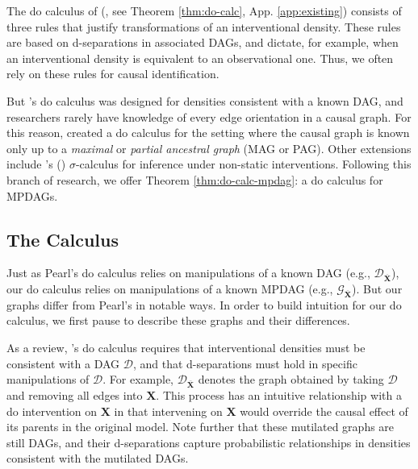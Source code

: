 \documentclass[11pt]{article}
\newcommand{\mb}[1]{\mathbf{#1}}
\newcommand{\g}[1][G]{\mathcal{#1}}
\begin{document}
The do calculus of \citeauthor{pearl2009causality} (\citeyear{pearl2009causality}, see Theorem \ref{thm:do-calc}, App. \ref{app:existing}) consists of three rules that justify transformations of an interventional density. These rules are based on d-separations in associated DAGs, and dictate, for example, when an interventional density is equivalent to an observational one. Thus, we often rely on these rules for causal identification.

But \citeauthor{pearl2009causality}'s do calculus was designed for densities consistent with a known DAG, and researchers rarely have knowledge of every edge orientation in a causal graph. For this reason, \cite{zhang2008causal} created a do calculus for the setting where the causal graph is known only up to a \textit{maximal} or \textit{partial ancestral graph} (MAG or PAG). Other extensions include \citeauthor{correa2020calculus}'s (\citeyear{correa2020calculus}) $\sigma$-calculus for inference under non-static interventions. Following this branch of research, we offer Theorem \ref{thm:do-calc-mpdag}: a do calculus for MPDAGs.



\subsection{The Calculus}
Just as Pearl's do calculus relies on manipulations of a known DAG (e.g., $\g[D]_{\overline{\mb{X}}}$), our do calculus relies on manipulations of a known MPDAG (e.g., $\g_{\overline{\mb{X}}}$). But our graphs differ from Pearl's in notable ways. In order to build intuition for our do calculus, we first pause to describe these graphs and their differences.

As a review, \citeauthor{pearl2009causality}'s do calculus requires that interventional densities must be consistent with a DAG $\g[D]$, and that d-separations must hold in specific manipulations of $\g[D]$. For example, $\g[D]_{\overline{\mb{X}}}$ denotes the graph obtained by taking $\g[D]$ and removing all edges into $\mb{X}$. This process has an intuitive relationship with a do intervention on $\mb{X}$ in that intervening on $\mb{X}$ would override the causal effect of its parents in the original model. Note further that these mutilated graphs are still DAGs, and their d-separations capture probabilistic relationships in densities consistent with the mutilated DAGs.
\end{document}
